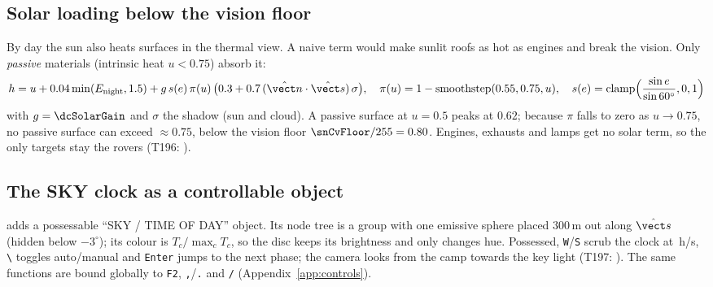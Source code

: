 \subsection{Solar loading below the vision floor}
By day the sun also heats surfaces in the thermal view. A naive term would make sunlit roofs as hot as engines and break the vision. Only \emph{passive} materials (intrinsic heat $u<0.75$) absorb it:
\begin{equation}
h=u+0.04\min(E_\text{night},1.5)+g\,s(e)\,\pi(u)\,\bigl(0.3+0.7\,(\hat{\vect n}\cdot\hat{\vect s})\,\sigma\bigr),\quad
\pi(u)=1-\mathrm{smoothstep}(0.55,0.75,u),\quad s(e)=\mathrm{clamp}\Bigl(\frac{\sin e}{\sin60^\circ},0,1\Bigr)
\end{equation}
with $g=\dcSolarGain$ and $\sigma$ the shadow (sun and cloud). A passive surface at $u=0.5$ peaks at $0.62$; because $\pi$ falls to zero as $u\to0.75$, no passive surface can exceed $\approx0.75$, below the vision floor $\snCvFloor/255=0.80$. Engines, exhausts and lamps get no solar term, so the only targets stay the rovers (T196: ).
\lstApparentHeat

\subsection{The SKY clock as a controllable object}
 adds a possessable ``SKY / TIME OF DAY'' object. Its node tree is a group with one emissive sphere placed $300$\,m out along $\hat{\vect s}$ (hidden below $-3^\circ$); its colour is $T_c/\max_c T_c$, so the disc keeps its brightness and only changes hue. Possessed, \texttt{W}/\texttt{S} scrub the clock at \dcScrub\,h/s, \texttt{\textbackslash} toggles auto/manual and \texttt{Enter} jumps to the next phase; the camera looks from the camp towards the key light (T197: ). The same functions are bound globally to \texttt{F2}, \texttt{,}/\texttt{.} and \texttt{/} (Appendix~\ref{app:controls}).
